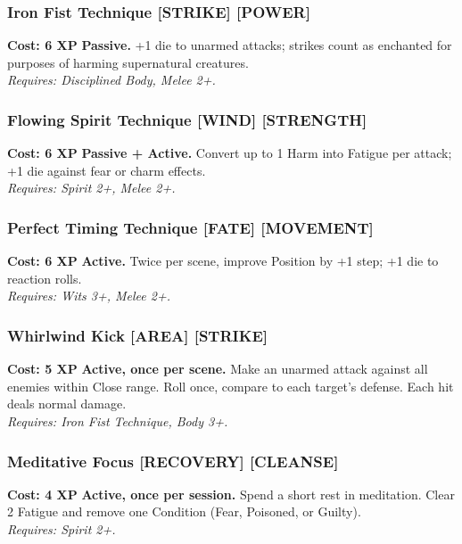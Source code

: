 \subsubsection*{Iron Fist Technique \textnormal{[STRIKE] [POWER]}}
\label{talent:iron-fist-technique}
\textbf{Cost: 6 XP} \textbf{Passive.} +1 die to unarmed attacks; strikes count as enchanted for purposes of harming supernatural creatures. \\
\textit{Requires: Disciplined Body, Melee 2+.}

\subsubsection*{Flowing Spirit Technique \textnormal{[WIND] [STRENGTH]}}
\label{talent:flowing-spirit-technique}
\textbf{Cost: 6 XP} \textbf{Passive + Active.} Convert up to 1 Harm into Fatigue per attack; +1 die against fear or charm effects. \\
\textit{Requires: Spirit 2+, Melee 2+.}

\subsubsection*{Perfect Timing Technique \textnormal{[FATE] [MOVEMENT]}}
\label{talent:perfect-timing-technique}
\textbf{Cost: 6 XP} \textbf{Active.} Twice per scene, improve Position by +1 step; +1 die to reaction rolls. \\
\textit{Requires: Wits 3+, Melee 2+.}

\subsubsection*{Whirlwind Kick \textnormal{[AREA] [STRIKE]}}
\label{talent:whirlwind-kick}
\textbf{Cost: 5 XP} \textbf{Active, once per scene.} Make an unarmed attack against all enemies within Close range. Roll once, compare to each target's defense. Each hit deals normal damage. \\
\textit{Requires: Iron Fist Technique, Body 3+.}

\subsubsection*{Meditative Focus \textnormal{[RECOVERY] [CLEANSE]}}
\label{talent:meditative-focus}
\textbf{Cost: 4 XP} \textbf{Active, once per session.} Spend a short rest in meditation. Clear 2 Fatigue and remove one Condition (Fear, Poisoned, or Guilty). \\
\textit{Requires: Spirit 2+.}

